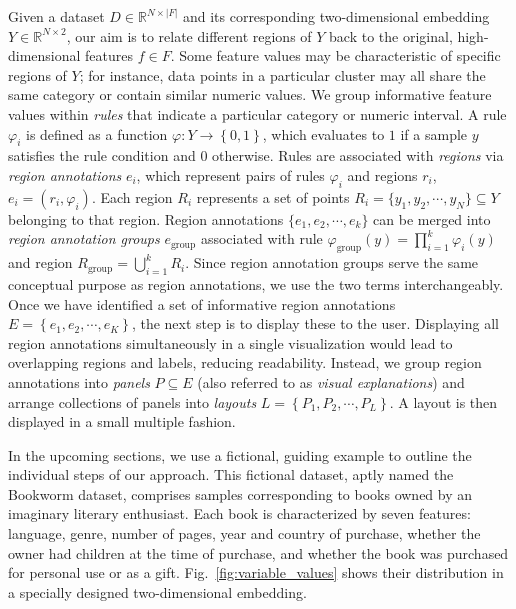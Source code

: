 \documentclass[lettersize,journal]{IEEEtran}
\begin{document}
Given a dataset $D \in \mathbb{R}^{N \times |F|}$ and its corresponding two-dimensional embedding $Y \in \mathbb{R}^{N \times 2}$, our aim is to relate different regions of $Y$ back to the original, high-dimensional features $f \in F$.
Some feature values may be characteristic of specific regions of $Y$; for instance, data points in a particular cluster may all share the same category or contain similar numeric values.
We group informative feature values within \textit{rules} that indicate a particular category or numeric interval.
A rule $\varphi_i$ is defined as a function $\varphi: Y \rightarrow \left \{ 0, 1
\right \} $, which evaluates to $1$ if a sample $y$ satisfies the rule condition and $0$ otherwise.
Rules are associated with \textit{regions} via \textit{region annotations} $e_i$, which represent pairs of rules $\varphi_i$ and regions $r_i$, $e_i = \left ( r_i, \varphi_i \right )$.
Each region $R_i$ represents a set of points $R_i = \{ y_1, y_2, \cdots, y_N \} \subseteq Y$ belonging to that region.
Region annotations $\{ e_1, e_2, \cdots, e_k \}$ can be merged into \textit{region annotation groups} $e_{\text{group}}$ associated with rule $\varphi_{\text{group}}(y) = \prod_{i=1}^k \varphi_i(y)$ and region $R_{\text{group}} = \bigcup_{i=1}^{k} R_i$. Since region annotation groups serve the same conceptual purpose as region annotations, we use the two terms interchangeably.
Once we have identified a set of informative region annotations $E = \left \{ e_1, e_2, \cdots, e_K \right \}$, the next step is to display these to the user. Displaying all region annotations simultaneously in a single visualization would lead to overlapping regions and labels, reducing readability.
Instead, we group region annotations into \textit{panels} $P \subseteq E$ (also referred to as \textit{visual explanations}) and arrange collections of panels into \textit{layouts} $L = \left \{ P_1, P_2, \cdots, P_L \right \}$. A layout is then displayed in a small multiple fashion.

In the upcoming sections, we use a fictional, guiding example to outline the individual steps of our approach.
This fictional dataset, aptly named the Bookworm dataset, comprises samples corresponding to books owned by an imaginary literary enthusiast. Each book is characterized by seven features: language, genre, number of pages, year and country of purchase, whether the owner had children at the time of purchase, and whether the book was purchased for personal use or as a gift.
Fig.~\ref{fig:variable_values} shows their distribution in a specially designed two-dimensional embedding.
\end{document}
